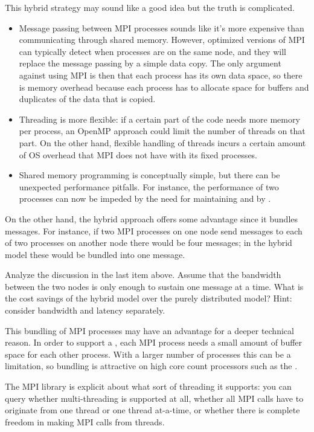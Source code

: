 This hybrid strategy may sound like a good idea but the truth is complicated.
\begin{itemize}
\item Message passing between MPI processes sounds like it's more
  expensive than communicating through shared memory. However,
  optimized versions of MPI can typically detect when processes are on
  the same node, and they will replace the message passing by a simple
  data copy. The only argument against using MPI is then that each
  process has its own data space, so there is memory overhead because
  each process has to allocate space for buffers and duplicates of the
  data that is copied.
\item Threading is more flexible: if a certain part of the code needs
  more memory per process, an OpenMP approach could limit the number
  of threads on that part. On the other hand, flexible handling of
  threads incurs a certain amount of \ac{OS} overhead that MPI does
  not have with its fixed processes.
\item Shared memory programming is conceptually simple, but there can
  be unexpected performance pitfalls. For instance, the performance of
  two processes can now be impeded by the need for maintaining
   and by .
\end{itemize}

On the other hand, the hybrid approach offers some advantage since it
bundles messages. For instance, if two MPI processes on one node send
messages to each of two processes on another node there would be four
messages; in the hybrid model these would be bundled into one
message.

\begin{exercise}
  Analyze the discussion in the last item above. Assume that the
  bandwidth between the two nodes is only enough to sustain one
  message at a time. What is the cost savings of the hybrid model over
  the purely distributed model? Hint: consider bandwidth and latency
  separately.
\end{exercise}

This bundling of MPI processes may have an advantage for a deeper
technical reason. In order to support a ,
each MPI process needs a small amount of buffer space for each other process.
With a larger number of processes this can be a limitation, so bundling
is attractive on high core count processors such as the .

The MPI library is explicit about what sort of threading it supports:
you can query whether multi-threading is supported at all, whether all MPI 
calls have to originate from one thread or one thread at-a-time, or whether 
there is complete freedom in making MPI calls from threads.
